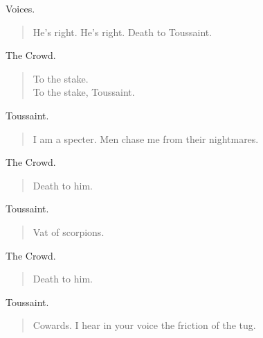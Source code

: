 \documentclass[letterpaper,article,12pt,oneside,notitlepage]{memoir}
\begin{document}
\begin{center}Voices.\end{center}

\begin{verse}
\hspace{1cm} He's right. He's right. Death to Toussaint. \\
\end{verse}

\begin{center}The Crowd.\end{center}

\begin{verse}
To the stake. \\
To the stake, Toussaint. \\
\end{verse}

\begin{center}Toussaint.\end{center}

\begin{verse}
\hspace{1cm} I am a specter. Men chase me from their nightmares. \\
\end{verse}

\begin{center}The Crowd.\end{center}

\begin{verse}
Death to him. \\
\end{verse}

\begin{center}Toussaint.\end{center}

\begin{verse}
Vat of scorpions. \\
\end{verse}

\begin{center}The Crowd.\end{center}

\begin{verse}
Death to him. \\
\end{verse}

\begin{center}Toussaint.\end{center}

\begin{verse}
Cowards. I hear in your voice the friction of the tug. \\
\end{verse}
\end{document}
